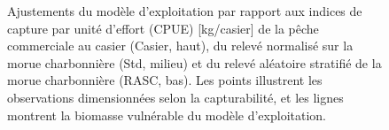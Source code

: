 \documentclass[11pt]{book}
\begin{document}
\begin{figure}[htb]

{\centering {} 

}

\caption{Ajustements du modèle d’exploitation par rapport aux indices de capture par unité d’effort (CPUE) [kg/casier] de la pêche commerciale au casier (Casier, haut), du relevé normalisé sur la morue charbonnière (Std, milieu) et du relevé aléatoire stratifié de la morue charbonnière (RASC, bas). Les points illustrent les observations dimensionnées selon la capturabilité, et les lignes montrent la biomasse vulnérable du modèle d’exploitation.}\label{fig:unnamed-chunk-19}
\end{figure}
\newpage
\end{document}
